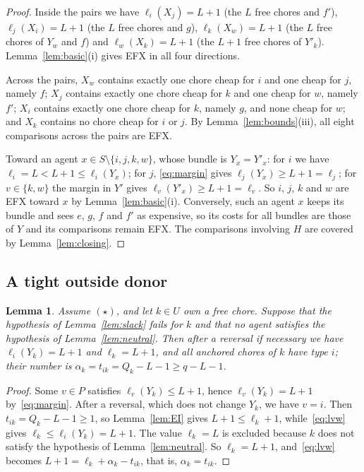 \documentclass{amsart}
\numberwithin{equation}{section}
\newtheorem{lemma}[theorem]{Lemma}
\theoremstyle{definition}
\theoremstyle{remark}
\begin{document}
\begin{proof}
Inside the pairs we have $\ell_i(X_j)=L+1$ (the $L$ free chores and $f'$), $\ell_j(X_i)=L+1$ (the $L$ free chores and $g$), $\ell_k(X_w)=L+1$ (the $L$ free chores of $Y_w$ and $f$) and $\ell_w(X_k)=L+1$ (the $L+1$ free chores of $Y'_k$). Lemma~\ref{lem:basic}(i) gives EFX in all four directions.

Across the pairs, $X_w$ contains exactly one chore cheap for $i$ and one cheap for $j$, namely $f$; $X_j$ contains exactly one chore cheap for $k$ and one cheap for $w$, namely $f'$; $X_i$ contains exactly one chore cheap for $k$, namely $g$, and none cheap for $w$; and $X_k$ contains no chore cheap for $i$ or $j$. By Lemma~\ref{lem:bounds}(iii), all eight comparisons across the pairs are EFX.

Toward an agent $x\in S\setminus\{i,j,k,w\}$, whose bundle is $Y_x=Y'_x$: for $i$ we have $\ell_i=L<L+1\le\ell_i(Y_x)$; for $j$, \eqref{eq:margin} gives $\ell_j(Y_x)\ge L+1=\ell_j$; for $v\in\{k,w\}$ the margin in $Y'$ gives $\ell_v(Y'_x)\ge L+1=\ell_v$. So $i$, $j$, $k$ and $w$ are EFX toward $x$ by Lemma~\ref{lem:basic}(i). Conversely, such an agent $x$ keeps its bundle and sees $e$, $g$, $f$ and $f'$ as expensive, so its costs for all bundles are those of $Y$ and its comparisons remain EFX. The comparisons involving $H$ are covered by Lemma~\ref{lem:closing}.
\end{proof}

\subsection{A tight outside donor}

\begin{lemma}\label{lem:tight}
Assume $(\star)$, and let $k\in U$ own a free chore. Suppose that the hypothesis of Lemma~\ref{lem:slack} fails for $k$ and that no agent satisfies the hypothesis of Lemma~\ref{lem:neutral}. Then after a reversal if necessary we have $\ell_i(Y_k)=L+1$ and $\ell_k=L+1$, and all anchored chores of $k$ have type $i$; their number is $\alpha_k=t_{ik}=Q_k-L-1\ge q-L-1$.
\end{lemma}

\begin{proof}
Some $v\in P$ satisfies $\ell_v(Y_k)\le L+1$, hence $\ell_v(Y_k)=L+1$ by~\eqref{eq:margin}. After a reversal, which does not change $Y_k$, we have $v=i$. Then $t_{ik}=Q_k-L-1\ge1$, so Lemma~\ref{lem:EI} gives $L+1\le\ell_k+1$, while~\eqref{eq:lvw} gives $\ell_k\le\ell_i(Y_k)=L+1$. The value $\ell_k=L$ is excluded because $k$ does not satisfy the hypothesis of Lemma~\ref{lem:neutral}. So $\ell_k=L+1$, and~\eqref{eq:lvw} becomes $L+1=\ell_k+\alpha_k-t_{ik}$, that is, $\alpha_k=t_{ik}$.
\end{proof}
\end{document}
